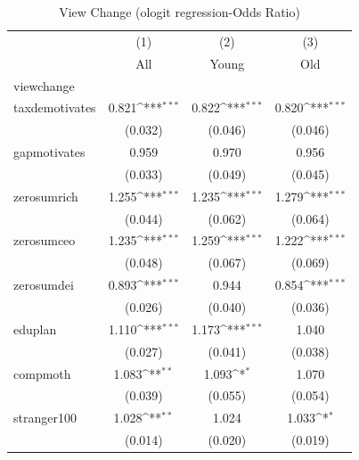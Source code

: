 \begin{table}[htbp]\centering
\def\sym#1{\ifmmode^{#1}\else\(^{#1}\)\fi}
\caption{View Change (ologit regression-Odds Ratio)}
\begin{tabular}{l*{3}{c}}
\toprule
            &\multicolumn{1}{c}{(1)}&\multicolumn{1}{c}{(2)}&\multicolumn{1}{c}{(3)}\\
            &\multicolumn{1}{c}{All}&\multicolumn{1}{c}{Young}&\multicolumn{1}{c}{Old}\\
\midrule
viewchange  &                     &                     &                     \\
taxdemotivates&       0.821\sym{***}&       0.822\sym{***}&       0.820\sym{***}\\
            &     (0.032)         &     (0.046)         &     (0.046)         \\
\addlinespace
gapmotivates&       0.959         &       0.970         &       0.956         \\
            &     (0.033)         &     (0.049)         &     (0.045)         \\
\addlinespace
zerosumrich &       1.255\sym{***}&       1.235\sym{***}&       1.279\sym{***}\\
            &     (0.044)         &     (0.062)         &     (0.064)         \\
\addlinespace
zerosumceo  &       1.235\sym{***}&       1.259\sym{***}&       1.222\sym{***}\\
            &     (0.048)         &     (0.067)         &     (0.069)         \\
\addlinespace
zerosumdei  &       0.893\sym{***}&       0.944         &       0.854\sym{***}\\
            &     (0.026)         &     (0.040)         &     (0.036)         \\
\addlinespace
eduplan     &       1.110\sym{***}&       1.173\sym{***}&       1.040         \\
            &     (0.027)         &     (0.041)         &     (0.038)         \\
\addlinespace
compmoth    &       1.083\sym{**} &       1.093\sym{*}  &       1.070         \\
            &     (0.039)         &     (0.055)         &     (0.054)         \\
\addlinespace
stranger100 &       1.028\sym{**} &       1.024         &       1.033\sym{*}  \\
            &     (0.014)         &     (0.020)         &     (0.019)         \\

\end{tabular}
\end{table}
